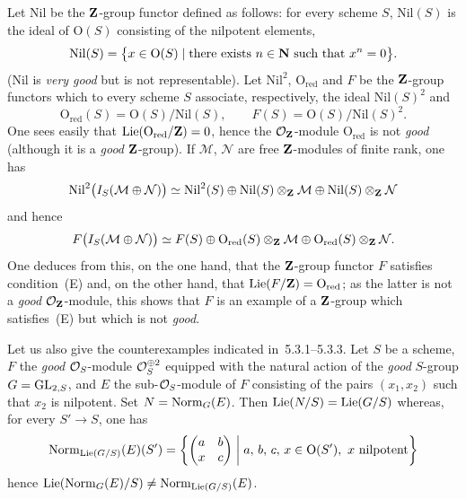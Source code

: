 \label{II.6.5}
{\renewcommand{\thefootnote}{(104)}}%
Let \(\mathrm{Nil}\) be the \(\mathbf{Z}\)-group functor defined as follows: for
every scheme \(S\), \(\mathrm{Nil}(S)\) is the ideal of \(\mathrm{O}(S)\)
consisting of the nilpotent elements, \ie
\[
\mathrm{Nil}(S)
=
\bigl\{x\in\mathrm{O}(S)\mid
\text{there exists }n\in\mathbf{N}\text{ such that }x^{n}=0\bigr\}.
\]
(\(\mathrm{Nil}\) is \emph{very good} but is not representable). Let
\(\mathrm{Nil}^{2}\), \(\mathrm{O}_{\mathrm{red}}\) and \(F\) be the
\(\mathbf{Z}\)-group functors which to every scheme \(S\) associate, respectively,
the ideal \(\mathrm{Nil}(S)^{2}\) and
\[
\mathrm{O}_{\mathrm{red}}(S)=\mathrm{O}(S)/\mathrm{Nil}(S),
\qquad
F(S)=\mathrm{O}(S)/\mathrm{Nil}(S)^{2}.
\]
One sees easily that \(\operatorname{Lie}(\mathrm{O}_{\mathrm{red}}/\mathbf{Z})=0\), hence the
\(\mathcal{O}_{\mathbf{Z}}\)-module \(\mathrm{O}_{\mathrm{red}}\) is not
\emph{good} (although it is a \emph{good} \(\mathbf{Z}\)-group). If
\(\mathcal{M}\), \(\mathcal{N}\) are free \(\mathbf{Z}\)-modules of finite rank,
one has
\[
\mathrm{Nil}^{2}\bigl(I_S(\mathcal{M}\oplus\mathcal{N})\bigr)
\simeq
\mathrm{Nil}^{2}(S)
\oplus\mathrm{Nil}(S)\otimes_{\mathbf{Z}}\mathcal{M}
\oplus\mathrm{Nil}(S)\otimes_{\mathbf{Z}}\mathcal{N}
\]
and hence
\[
F\bigl(I_S(\mathcal{M}\oplus\mathcal{N})\bigr)
\simeq
F(S)
\oplus\mathrm{O}_{\mathrm{red}}(S)\otimes_{\mathbf{Z}}\mathcal{M}
\oplus\mathrm{O}_{\mathrm{red}}(S)\otimes_{\mathbf{Z}}\mathcal{N}.
\]
One deduces from this, on the one hand, that the \(\mathbf{Z}\)-group functor \(F\)
satisfies condition~(E) and, on the other hand, that
\(\operatorname{Lie}(F/\mathbf{Z})=\mathrm{O}_{\mathrm{red}}\); as the latter is not a
\emph{good} \(\mathcal{O}_{\mathbf{Z}}\)-module, this shows that \(F\) is an
example of a \(\mathbf{Z}\)-group which satisfies~(E) but which is not
\emph{good}.

\label{II.6.5.1}
Let us also give the counterexamples indicated in~5.3.1--5.3.3. Let \(S\)
be a scheme, \(F\) the \emph{good} \(\mathcal{O}_S\)-module \(\mathcal{O}_S^{\oplus 2}\)
equipped with the natural action of the \emph{good} \(S\)-group
\(G=\operatorname{GL}_{2,S}\), and \(E\) the sub-\(\mathcal{O}_S\)-module of \(F\) consisting of the
pairs \((x_1,x_2)\) such that \(x_2\) is nilpotent. Set
\(N=\operatorname{Norm}_G(E)\). Then \(\operatorname{Lie}(N/S)=\operatorname{Lie}(G/S)\) whereas, for every
\(S'\to S\), one has
\[
\operatorname{Norm}_{\operatorname{Lie}(G/S)}(E)(S')
=
\left\{
\begin{pmatrix} a & b \\ x & c \end{pmatrix}
\;\middle|\;
a,\,b,\,c,\,x\in\mathrm{O}(S'),\ x\text{ nilpotent}
\right\}
\]
hence \(\operatorname{Lie}(\operatorname{Norm}_G(E)/S)\neq\operatorname{Norm}_{\operatorname{Lie}(G/S)}(E)\).

